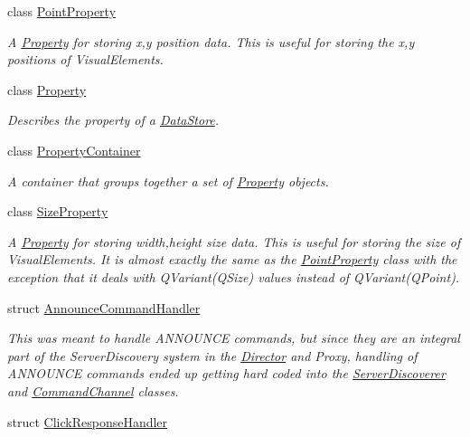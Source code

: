 \begin{DoxyCompactItemize}
class \hyperlink{class_picto_1_1_point_property}{Point\-Property}
\begin{DoxyCompactList}\small\item\em A \hyperlink{class_picto_1_1_property}{Property} for storing x,y position data. This is useful for storing the x,y positions of Visual\-Elements. \end{DoxyCompactList}\item 
class \hyperlink{class_picto_1_1_property}{Property}
\begin{DoxyCompactList}\small\item\em Describes the property of a \hyperlink{class_picto_1_1_data_store}{Data\-Store}. \end{DoxyCompactList}\item 
class \hyperlink{class_picto_1_1_property_container}{Property\-Container}
\begin{DoxyCompactList}\small\item\em A container that groups together a set of \hyperlink{class_picto_1_1_property}{Property} objects. \end{DoxyCompactList}\item 
class \hyperlink{class_picto_1_1_size_property}{Size\-Property}
\begin{DoxyCompactList}\small\item\em A \hyperlink{class_picto_1_1_property}{Property} for storing width,height size data. This is useful for storing the size of Visual\-Elements. It is almost exactly the same as the \hyperlink{class_picto_1_1_point_property}{Point\-Property} class with the exception that it deals with Q\-Variant(\-Q\-Size) values instead of Q\-Variant(\-Q\-Point). \end{DoxyCompactList}\item 
struct \hyperlink{struct_picto_1_1_announce_command_handler}{Announce\-Command\-Handler}
\begin{DoxyCompactList}\small\item\em This was meant to handle A\-N\-N\-O\-U\-N\-C\-E commands, but since they are an integral part of the Server\-Discovery system in the \hyperlink{class_director}{Director} and Proxy, handling of A\-N\-N\-O\-U\-N\-C\-E commands ended up getting hard coded into the \hyperlink{struct_picto_1_1_server_discoverer}{Server\-Discoverer} and \hyperlink{class_picto_1_1_command_channel}{Command\-Channel} classes. \end{DoxyCompactList}\item 
struct \hyperlink{struct_picto_1_1_click_response_handler}{Click\-Response\-Handler}

\end{DoxyCompactItemize}
